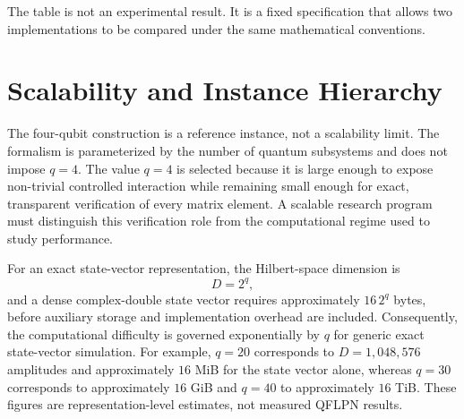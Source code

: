 \documentclass[final,3p,times]{elsarticle}
\begin{document}
The table is not an experimental result. It is a fixed specification that allows two implementations to be compared under the same mathematical conventions.

\section{Scalability and Instance Hierarchy}

The four-qubit construction is a reference instance, not a scalability limit. The formalism is parameterized by the number of quantum subsystems and does not impose $q=4$. The value $q=4$ is selected because it is large enough to expose non-trivial controlled interaction while remaining small enough for exact, transparent verification of every matrix element. A scalable research program must distinguish this verification role from the computational regime used to study performance.

For an exact state-vector representation, the Hilbert-space dimension is
\begin{equation}
    D=2^q,
\end{equation}
and a dense complex-double state vector requires approximately $16\,2^q$ bytes, before auxiliary storage and implementation overhead are included. Consequently, the computational difficulty is governed exponentially by $q$ for generic exact state-vector simulation. For example, $q=20$ corresponds to $D=1,048,576$ amplitudes and approximately $16$ MiB for the state vector alone, whereas $q=30$ corresponds to approximately $16$ GiB and $q=40$ to approximately $16$ TiB. These figures are representation-level estimates, not measured QFLPN results.
\end{document}

